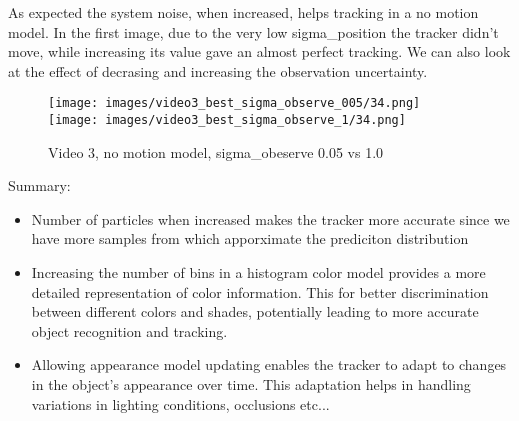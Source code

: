 \documentclass{ETHExercise}
\begin{document}
As expected the system noise, when increased, helps tracking in a no motion model. In the first 
image, due to the very low sigma\_position the tracker didn't move, while increasing its value 
gave an almost perfect tracking.
\newpage
We can also look at the effect of decrasing and increasing the observation uncertainty.

\begin{figure}[!h]
    \texttt{[image: images/video3\_best\_sigma\_observe\_005/34.png]}
  \endminipage
    \texttt{[image: images/video3\_best\_sigma\_observe\_1/34.png]}
  \endminipage
  \caption{Video 3, no motion model, sigma\_obeserve 0.05 vs 1.0}
\end{figure}

Summary:
\begin{itemize}
  \item Number of particles when increased makes the tracker more accurate
  since we have more samples from which apporximate the prediciton distribution
  \item Increasing the number of bins in a histogram color model provides a more detailed 
  representation of color information. This for better discrimination 
  between different colors and shades, potentially leading to more accurate 
  object recognition and tracking.
  \item Allowing appearance model updating enables the tracker to adapt to 
  changes in the object's appearance over time. This adaptation helps in 
  handling variations in lighting conditions, occlusions etc...
\end{itemize}
\end{document}
